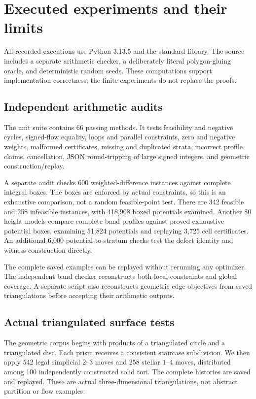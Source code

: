 \documentclass[11pt,letterpaper]{article}
\theoremstyle{definition}
\begin{document}
\section{Executed experiments and their limits}\label{sec:experiments}
All recorded executions use Python 3.13.5 and the standard library. The source includes a separate arithmetic checker, a deliberately literal polygon-gluing oracle, and deterministic random seeds. These computations support implementation correctness; the finite experiments do not replace the proofs.

\subsection{Independent arithmetic audits}
The unit suite contains 66 passing methods. It tests feasibility and negative cycles, signed-flow equality, loops and parallel constraints, zero and negative weights, malformed certificates, missing and duplicated strata, incorrect profile claims, cancellation, JSON round-tripping of large signed integers, and geometric construction/replay.

A separate audit checks 600 weighted-difference instances against complete integral boxes. The boxes are enforced by actual constraints, so this is an exhaustive comparison, not a random feasible-point test. There are 342 feasible and 258 infeasible instances, with 418,908 boxed potentials examined. Another 80 height models compare complete band profiles against proved exhaustive potential boxes, examining 51,824 potentials and replaying 3,725 cell certificates. An additional 6,000 potential-to-stratum checks test the defect identity and witness construction directly.

The complete saved examples can be replayed without rerunning any optimizer. The independent band checker reconstructs both local constraints and global coverage. A separate script also reconstructs geometric edge objectives from saved triangulations before accepting their arithmetic outputs.

\subsection{Actual triangulated surface tests}
The geometric corpus begins with products of a triangulated circle and a triangulated disc. Each prism receives a consistent staircase subdivision. We then apply 542 legal simplicial $2$--$3$ moves and 258 stellar $1$--$4$ moves, distributed among 100 independently constructed solid tori. The complete histories are saved and replayed. These are actual three-dimensional triangulations, not abstract partition or flow examples.
\end{document}
